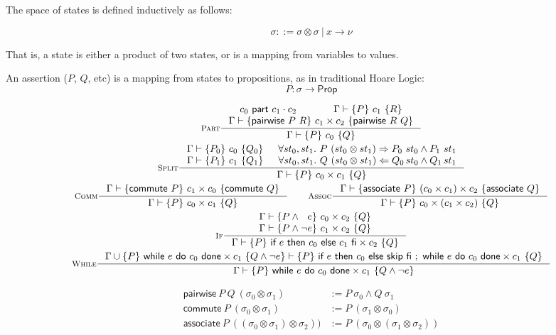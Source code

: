 \documentclass{article}
\newcommand{\triple}[3]{\{#1\}~#2~\{#3\}}
\newcommand{\ppart}[3]{#1~\textsf{part}~#2\cdot#3}
\newcommand{\judges}{\vdash}
\newcommand{\judgement}[4]{#1 \judges \triple{#2}{#3}{#4}}
\newcommand{\cif}[3]{\textsf{if}~#1~\textsf{then}~#2~\textsf{else}~#3~\textsf{fi}}
\newcommand{\cwhile}[2]{\textsf{while}~#1~\textsf{do}~#2~\textsf{done}}
\newcommand{\cskip}{\textsf{skip}}
\newcommand{\commute}{\textsf{commute}}
\newcommand{\associate}{\textsf{associate}}
\newcommand{\pairwise}{\textsf{pairwise}}
\begin{document}
The space of states is defined inductively as follows:

\[ \sigma ::= \sigma \otimes \sigma~|~x \rightarrow \nu \]

That is, a state is either a product of two states, or is a mapping from
variables to values.

An assertion ($P$, $Q$, etc) is a mapping from states to propositions,
as in traditional Hoare Logic:
\[P : \sigma \rightarrow \textsf{Prop}\]

\begin{spreadlines}{10pt}
\begin{gather*}
  \inference[\textsc{Part}]{%
    \ppart{c_0}{c_1}{c_2}&
    \judgement{\Gamma}{P}{c_1}{R}\\
    \judgement{\Gamma}{\pairwise~P~R}{c_1 \times c_2}{\pairwise~R~Q}
  }{%
    \judgement{\Gamma}{P}{c_0}{Q}
  }
  \\
  \inference[\textsc{Split}]{%
    \judgement{\Gamma}{P_0}{c_0}{Q_0}&
    \forall st_0, st_1.~P~(st_0 \otimes st_1) \Rightarrow P_0~st_0 \land P_1~st_1\\
    \judgement{\Gamma}{P_1}{c_1}{Q_1}&
    \forall st_0, st_1.~Q~(st_0 \otimes st_1) \Leftarrow Q_0\!~st_0 \land Q_1\!~st_1\\
  }{%
    \judgement{\Gamma}{P}{c_0 \times c_1}{Q}
  }
  \\
  \inference[\textsc{Comm}]{%
    \judgement{\Gamma}{\commute~P}{c_1 \times c_0}{\commute~Q}
  }{%
    \judgement{\Gamma}{P}{c_0 \times c_1}{Q}
  }
  \qquad
  \inference[\textsc{Assoc}]{%
    \judgement{\Gamma}{\associate~P}{(c_0 \times c_1) \times c_2}{\associate~Q}
  }{%
    \judgement{\Gamma}{P}{c_0 \times (c_1 \times c_2)}{Q}
  }
  \\
  \inference[$\textsc{If}$]{%
    \judgement{\Gamma}{P \land ~~e}{c_0 \times c_2}{Q}\\
    \judgement{\Gamma}{P \land \neg e}{c_1 \times c_2}{Q}
  }{%
    \judgement{\Gamma}{P}{\cif{e}{c_0}{c_1} \times c_2}{Q}
  }
  \\
  \inference[$\textsc{While}$]{%
    \judgement{%
      \Gamma \cup \triple{P}{\cwhile{e}{c_0} \times c_1}{Q \land \neg e}
    }{P}{\cif{e}{c_0}{\cskip}~;~\cwhile{e}{c_0} \times c_1}{Q}
  }{%
    \judgement{\Gamma}{P}{\cwhile{e}{c_0} \times c_1}{Q \land \neg e}
  }
\end{gather*}
\end{spreadlines}

\begin{align*}
  \pairwise~P~Q~(\sigma_0\otimes\sigma_1) &:= P~\sigma_0 \land Q~\sigma_1\\
  \commute~P~(\sigma_0 \otimes \sigma_1) &:= P~(\sigma_1 \otimes \sigma_0)\\
  \associate~P~((\sigma_0 \otimes \sigma_1) \otimes \sigma_2)) &:=
    P~(\sigma_0 \otimes (\sigma_1 \otimes \sigma_2))
\end{align*}
\end{document}

